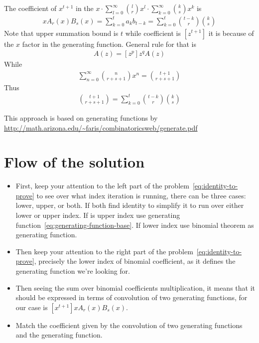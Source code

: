 ﻿\documentclass{article}
\begin{document}
    The coefficient of $x^{t+1}$ in the $x \cdot \sum_{l=0}^{\infty} \binom{l}{r} x^l \cdot \sum_{k=0}^{\infty} \binom{k}{s} x^k$ is
    \begin{align*}
    [x^{t+1}]
        x A_r(x) B_s(x) = \sum_{k=0}^{t} a_k b_{t-k} = \sum_{k=0}^{t} \binom{t-k}{r} \binom{k}{s}
    \end{align*}
    Note that upper summation bound is $t$ while coefficient is $[z^{t+1}]$ it is because of the $x$ factor in the generating function.
    General rule for that is
    \begin{align*}
    [z^{p-q}]
        A(z)=[z^p]z^qA(z)
    \end{align*}
    While
    \begin{align*}
    [z^{t+1}]
        \sum_{n=0}^{\infty} \binom{n}{r+s+1} x^n = \binom{t+1}{r+s+1}
    \end{align*}
    Thus
    \begin{align*}
        \binom{t+1}{r+s+1} = \sum_{k=0}^{t} \binom{t-k}{r} \binom{k}{s}
    \end{align*}

    This approach is based on generating functions
    by \url{http://math.arizona.edu/~faris/combinatoricsweb/generate.pdf}


    \section{Flow of the solution}\label{sec:flow-of-the-solution}
    \begin{itemize}
        \item First, keep your attention to the left part of the problem~\eqref{eq:identity-to-prove}
        to see over what index iteration is running, there can be three cases: lower, upper, or both.
        If both find identity to simplify it to run over either lower or upper index.
        If is upper index use generating function~\eqref{eq:generating-function-base}.
        If lower index use binomial theorem as generating function.
        \item Then keep your attention to the right part of the problem~\eqref{eq:identity-to-prove},
        precisely the lower index of binomial coefficient, as it defines the generating function
        we're looking for.
        \item Then seeing the sum over binomial coefficients multiplication,
        it means that it should be expressed in terms of convolution of two generating functions,
        for our case is $[x^{t+1}] x A_r(x) B_s(x)$.
        \item Match the coefficient given by the convolution of two generating functions and the generating function.
    \end{itemize}
\end{document}
